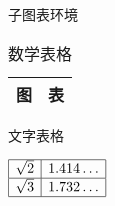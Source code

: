\documentclass[nofonts]{ctexart}
\begin{document}
\begin{table}
	\caption{子图表环境}
	\begin{subtable}[b]{.5\textwidth}
		\centering
		\begin{tabular}{|c|c|}
			\hline
			图	& 表	\\
			\hline
		\end{tabular}
		\caption{文字表格}
	\end{subtable}
	\begin{subtable}[b]{.5\textwidth}
		\centering
		$ \begin{array}{|c|c|}
			\hline 
			\sqrt{2}	& 1.414\dots	\\
			\hline
			\sqrt{3}	& 1.732\dots	\\
			\hline
		\end{array} $
		\caption{数学表格}
	\end{subtable}
\end{table}
\end{document}
